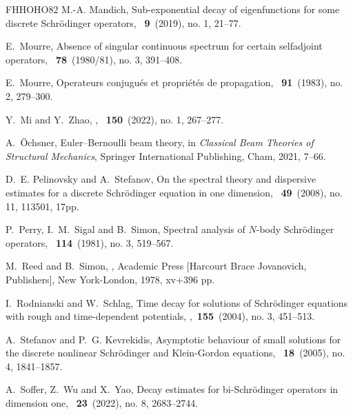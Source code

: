 \documentclass[reqno, 11pt]{amsart}
\numberwithin{equation}{section}
\begin{document}
\begin{thebibliography}{FHHOHO82}
M.-A. Mandich,
\newblock Sub-exponential decay of eigenfunctions for some discrete
  {S}chr\"odinger operators,
~{\bf9}~(2019), no. 1, 21--77.

E.~Mourre,
\newblock Absence of singular continuous spectrum for certain selfadjoint
  operators,
~{\bf78}~(1980/81), no. 3, 391--408.

E.~Mourre,
\newblock Operateurs conjugu\'es et propri\'et\'es de propagation,
~{\bf91}~(1983), no. 2, 279--300.


Y.~Mi and Y.~Zhao,
,
~{\bf150}~(2022), no. 1, 267--277.

A.~\"{O}chsner,
\newblock Euler--Bernoulli beam theory,
\newblock in {\em Classical Beam Theories of Structural Mechanics}, Springer International Publishing, Cham, 2021, 7--66.

D.~E. Pelinovsky and A.~Stefanov,
\newblock On the spectral theory and dispersive estimates for a discrete
  {S}chr\"odinger equation in one dimension,
~{\bf49}~(2008), no. 11, 113501, 17pp.


P.~Perry, I.~M.~Sigal and B.~Simon,
\newblock Spectral analysis of {$N$}-body {S}chr\"odinger operators, 
~{\bf 114}~(1981), no. 3, 519--567.

M.~Reed and B.~Simon,
,
\newblock Academic Press [Harcourt Brace Jovanovich, Publishers], New York-London, 1978, xv+396 pp.

 \newblock I.~Rodnianski and W.~Schlag,
  \newblock Time decay for solutions of {S}chr\"odinger equations with
 rough and time-dependent potentials,
  ,~{\bf155}~(2004), no. 3, 451--513.

A.~Stefanov and P.~G. Kevrekidis,
\newblock Asymptotic behaviour of small solutions for the discrete nonlinear
  {S}chr\"odinger and {K}lein-{G}ordon equations,
~{\bf18}~(2005), no. 4, 1841--1857.

A.~Soffer, Z.~Wu and X.~Yao,
\newblock Decay estimates for bi-{S}chr\"odinger operators in dimension one,
~{\bf23}~(2022), no. 8, 2683--2744.


\end{thebibliography}
\end{document}
